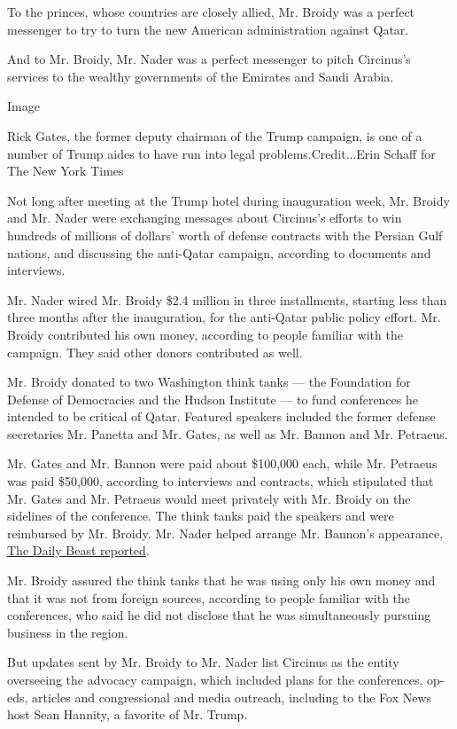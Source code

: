 To the princes, whose countries are closely allied, Mr. Broidy was a
perfect messenger to try to turn the new American administration against
Qatar.

And to Mr. Broidy, Mr. Nader was a perfect messenger to pitch Circinus's
services to the wealthy governments of the Emirates and Saudi Arabia.

Image

Rick Gates, the former deputy chairman of the Trump campaign, is one of
a number of Trump aides to have run into legal problems.Credit...Erin
Schaff for The New York Times

Not long after meeting at the Trump hotel during inauguration week, Mr.
Broidy and Mr. Nader were exchanging messages about Circinus's efforts
to win hundreds of millions of dollars' worth of defense contracts with
the Persian Gulf nations, and discussing the anti-Qatar campaign,
according to documents and interviews.

Mr. Nader wired Mr. Broidy \$2.4 million in three installments, starting
less than three months after the inauguration, for the anti-Qatar public
policy effort. Mr. Broidy contributed his own money, according to people
familiar with the campaign. They said other donors contributed as well.

Mr. Broidy donated to two Washington think tanks --- the Foundation for
Defense of Democracies and the Hudson Institute --- to fund conferences
he intended to be critical of Qatar. Featured speakers included the
former defense secretaries Mr. Panetta and Mr. Gates, as well as Mr.
Bannon and Mr. Petraeus.

Mr. Gates and Mr. Bannon were paid about \$100,000 each, while Mr.
Petraeus was paid \$50,000, according to interviews and contracts, which
stipulated that Mr. Gates and Mr. Petraeus would meet privately with Mr.
Broidy on the sidelines of the conference. The think tanks paid the
speakers and were reimbursed by Mr. Broidy. Mr. Nader helped arrange Mr.
Bannon's appearance,
\href{https://www.thedailybeast.com/accused-sex-trafficker-george-nader-helped-steve-bannon-land-dollar100k-payday}{The
Daily Beast reported}.

Mr. Broidy assured the think tanks that he was using only his own money
and that it was not from foreign sources, according to people familiar
with the conferences, who said he did not disclose that he was
simultaneously pursuing business in the region.

But updates sent by Mr. Broidy to Mr. Nader list Circinus as the entity
overseeing the advocacy campaign, which included plans for the
conferences, op-eds, articles and congressional and media outreach,
including to the Fox News host Sean Hannity, a favorite of Mr. Trump.

